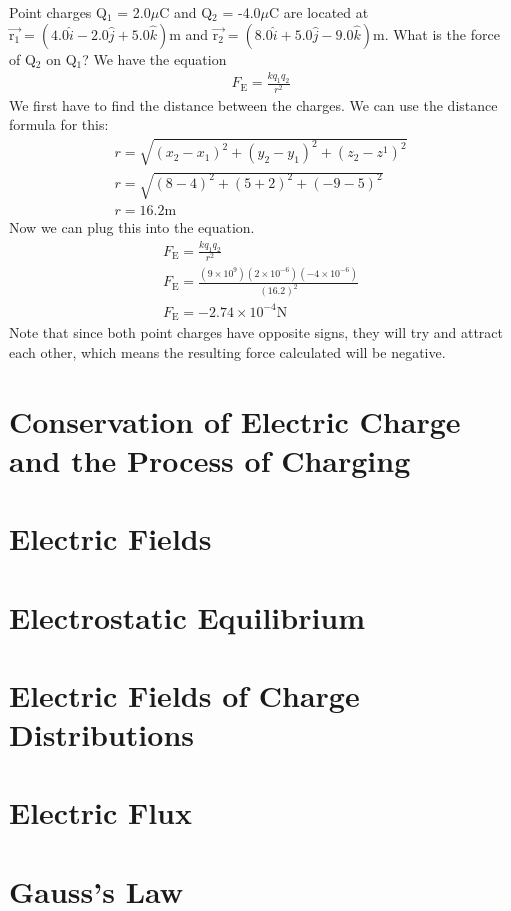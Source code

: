 \documentclass[../em.tex]{subfiles}
\begin{document}
\begin{example}
    Point charges Q$_1$ = 2.0$\mu$C and Q$_2$ = -4.0$\mu$C are located at $\vec{\text{r}_1} = (4.0\hat{i}-2.0\hat{j}+5.0\hat{k})$m and 
    $\vec{\text{r}_2} = (8.0\hat{i}+5.0\hat{j}-9.0\hat{k})$m. What is the force of Q$_2$ on Q$_1$?
    \smallbreak
    We have the equation 
    \begin{align*}
        F_\text{E}=\frac{kq_1q_2}{r^2}
    \end{align*}
    We first have to find the distance between the charges. We can use the distance formula for this:
    \begin{align*}
        r = \sqrt{(x_2-x_1)^2+(y_2-y_1)^2+(z_2-z^1)^2}\\
        r = \sqrt{(8-4)^2+(5+2)^2+(-9-5)^2}\\
        r = 16.2 \text{m}
    \end{align*}
    Now we can plug this into the equation.
    \begin{align*}
        F_\text{E}=\frac{kq_1q_2}{r^2}\\
        F_\text{E}=\frac{(9\times10^9)(2\times10^{-6})(-4\times10^{-6})}{(16.2)^2}\\
        F_\text{E}=-2.74\times10^{-4}\text{N}
    \end{align*}
    Note that since both point charges have opposite signs, they will try and attract each other, which means the resulting force calculated 
    will be negative.
\end{example}
\section{Conservation of Electric Charge and the Process of Charging}
\section{Electric Fields}
\section{Electrostatic Equilibrium}
\section{Electric Fields of Charge Distributions}
\section{Electric Flux}
\section{Gauss's Law}
\end{document}
